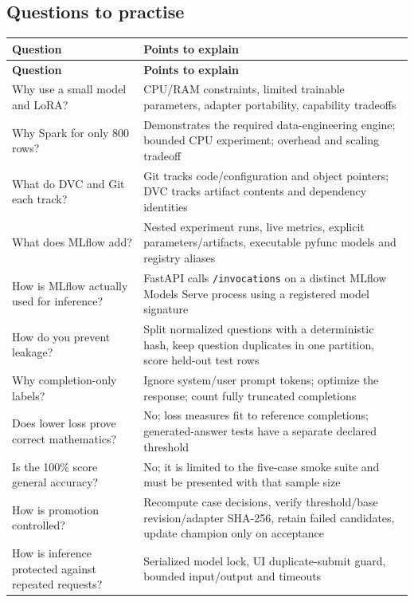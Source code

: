 \documentclass[11pt,a4paper]{article}
\begin{document}
\subsection*{Questions to practise}
\begingroup\small
\begin{longtable}{@{}>{\raggedright\arraybackslash}p{0.5000\dimexpr\textwidth-12pt\relax}>{\raggedright\arraybackslash}p{0.5000\dimexpr\textwidth-12pt\relax}@{}}
\toprule
\textbf{Question} & \textbf{Points to explain} \\
\midrule
\endfirsthead
\textbf{Question} & \textbf{Points to explain} \\
\midrule
\endhead
Why use a small model and LoRA? & CPU/RAM constraints, limited trainable parameters, adapter portability, capability tradeoffs \\
Why Spark for only 800 rows? & Demonstrates the required data-engineering engine; bounded CPU experiment; overhead and scaling tradeoff \\
What do DVC and Git each track? & Git tracks code/configuration and object pointers; DVC tracks artifact contents and dependency identities \\
What does MLflow add? & Nested experiment runs, live metrics, explicit parameters/artifacts, executable pyfunc models and registry aliases \\
How is MLflow actually used for inference? & FastAPI calls \texttt{/\allowbreak{}invocations} on a distinct MLflow Models Serve process using a registered model signature \\
How do you prevent leakage? & Split normalized questions with a deterministic hash, keep question duplicates in one partition, score held-out test rows \\
Why completion-only labels? & Ignore system/user prompt tokens; optimize the response; count fully truncated completions \\
Does lower loss prove correct mathematics? & No; loss measures fit to reference completions; generated-answer tests have a separate declared threshold \\
Is the 100\% score general accuracy? & No; it is limited to the five-case smoke suite and must be presented with that sample size \\
How is promotion controlled? & Recompute case decisions, verify threshold/base revision/adapter SHA-256, retain failed candidates, update champion only on acceptance \\
How is inference protected against repeated requests? & Serialized model lock, UI duplicate-submit guard, bounded input/output and timeouts \\

\end{longtable}
\end{document}
